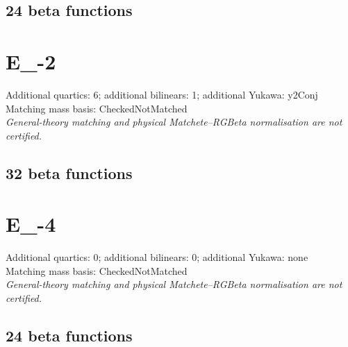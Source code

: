 \documentclass[10pt,a4paper]{article}
\begin{document}
\subsection*{24 beta functions}

\clearpage
\section{E\_-2}
Additional quartics: 6; additional bilinears: 1; additional Yukawa: y2Conj\\
Matching mass basis: CheckedNotMatched\\
\emph{General-theory matching and physical Matchete--RGBeta normalisation are not certified.}
\subsection*{32 beta functions}

\clearpage
\section{E\_-4}
Additional quartics: 0; additional bilinears: 0; additional Yukawa: none\\
Matching mass basis: CheckedNotMatched\\
\emph{General-theory matching and physical Matchete--RGBeta normalisation are not certified.}
\subsection*{24 beta functions}

\end{document}
